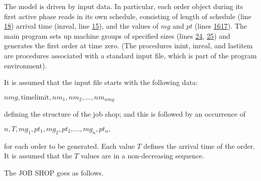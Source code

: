 The model is driven by input data. In particular, each order object during its first active phase reads in its own schedule, consisting of length of schedule (line \hyperref[pg:program-job-shop-18]{18}) arrival time (inreal, line \hyperref[pg:program-job-shop-15]{15}), and the values of $mg$ and $pt$ (lines \hyperref[pg:program-job-shop-16]{16}\textendash\hyperref[pg:program-job-shop-17]{17}). The main program sets up machine groups of specified sizes (lines \hyperref[pg:program-job-shop-24]{24}, \hyperref[pg:program-job-shop-25]{25}) and generates the first order at time zero. (The procedures inint, inreal, and lastitem are procedures associated with a standard input file, which is part of the program environment).

It is assumed that the input file starts with the following data:

\quad $nmg, \text{timelimit}, nm_1, nm_2, \dots, nm_{nmg}$

\noindent
defining the structure of the job shop; and this is followed by an occurrence of

\quad $n, T, mg_1, pt_1, mg_2, pt_2, \dots, mg_n, pt_n,$

\noindent
for each order to be generated. Each value $T$ defines the arrival time of the order. It is assumed that the $T$ values are in a non-decreasing sequence.

The JOB SHOP goes as follows.

